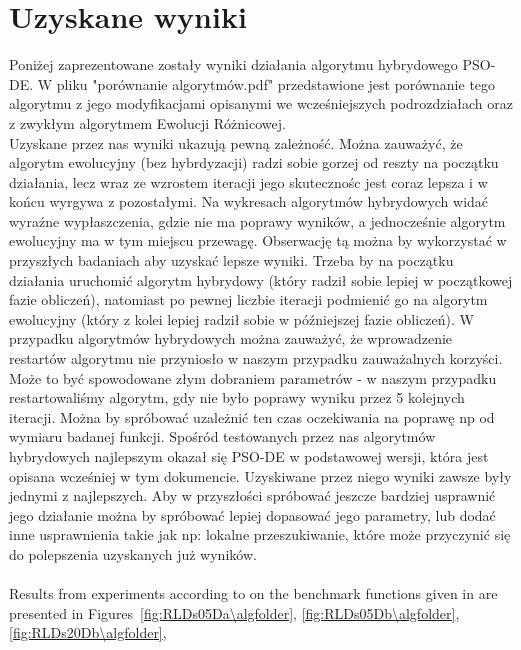 \documentclass{article}
\begin{document}
\section{Uzyskane wyniki}
Poniżej zaprezentowane zostały wyniki działania algorytmu hybrydowego PSO-DE. W pliku "porównanie algorytmów.pdf" przedstawione jest porównanie tego algorytmu z jego modyfikacjami opisanymi we wcześniejszych podrozdziałach oraz z zwykłym algorytmem Ewolucji Różnicowej.\\
Uzyskane przez nas wyniki ukazują pewną zależność. Można zauważyć, że algorytm ewolucyjny (bez hybrdyzacji) radzi sobie gorzej od reszty na początku działania, lecz wraz ze wzrostem iteracji jego skutecznośc jest coraz lepsza i w końcu wyrgywa z pozostałymi. Na wykresach algorytmów hybrydowych widać wyraźne wypłaszczenia, gdzie nie ma poprawy wyników, a jednocześnie algorytm ewolucyjny ma w tym miejscu przewagę. Obserwację tą można by wykorzystać w przyszłych badaniach aby uzyskać lepsze wyniki. Trzeba by na początku działania uruchomić algorytm hybrydowy (który radził sobie lepiej w początkowej fazie obliczeń), natomiast po pewnej liczbie iteracji podmienić go na algorytm ewolucyjny (który z kolei lepiej radził sobie w późniejszej fazie obliczeń).
W przypadku algorytmów hybrydowych można zauważyć, że wprowadzenie restartów algorytmu nie przyniosło w naszym przypadku zauważalnych korzyści. Może to być spowodowane złym dobraniem parametrów - w naszym przypadku restartowaliśmy algorytm, gdy nie było poprawy wyniku przez 5 kolejnych iteracji. Można by spróbować uzależnić ten czas oczekiwania na poprawę np od wymiaru badanej funkcji.
Spośród testowanych przez nas algorytmów hybrydowych najlepszym okazał się PSO-DE w podstawowej wersji, która jest opisana wcześniej w tym dokumencie. Uzyskiwane przez niego wyniki zawsze były jednymi z najlepszych. Aby w przyszłości spróbować jeszcze bardziej usprawnić jego działanie można by spróbować lepiej dopasować jego parametry, lub dodać inne usprawnienia takie jak np: lokalne przeszukiwanie, które może przyczynić się do polepszenia uzyskanych już wyników.\\
\\
Results from experiments according to \cite{hansen2010exp} on the
benchmark functions given in \cite{wp200901_2010,hansen2010fun} are presented
in Figures~\ref{fig:RLDs05Da\algfolder}, \ref{fig:RLDs05Db\algfolder},
\ref{fig:RLDs20Db\algfolder},
\end{document}

